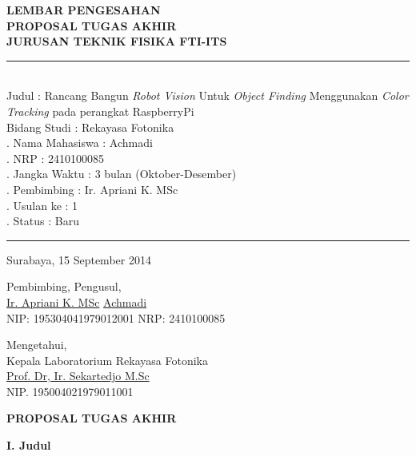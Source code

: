 \documentclass[a4paper,12pt]{article}
\begin{document}
\newpage
\begin{center}
  \textbf{ LEMBAR PENGESAHAN  }\\[5pt]
  \textbf{ PROPOSAL TUGAS AKHIR  } \\[5pt]
  \textbf{ JURUSAN TEKNIK FISIKA FTI-ITS  }\\[5pt]
\end{center}
\rule{385pt}{5pt}\\
\noindent Judul \hspace{80pt} : Rancang Bangun \textit{Robot Vision} Untuk \textit{Object Finding} Menggunakan \textit{Color Tracking} pada perangkat RaspberryPi\\[5pt]
\noindent Bidang Studi \hspace{42pt} : Rekayasa Fotonika\\[5pt]
. Nama Mahasiswa \hspace{5pt} : Achmadi\\[5pt]
. NRP  \hspace{70pt} : 2410100085\\[5pt]
. Jangka Waktu \hspace{20pt} : 3 bulan (Oktober-Desember)\\[5pt]
. Pembimbing \hspace{28pt} : Ir. Apriani K. MSc\\[5pt]
. Usulan ke \hspace{40pt} : 1\\[5pt]
. Status \hspace{60pt} : Baru\\[5pt]
\rule{385pt}{5pt}
\begin{flushright}
  Surabaya, 15 September 2014
\end{flushright}
\begin{flushleft}
Pembimbing, \hspace{230pt} Pengusul, 
\\[40pt]
\underline{Ir. Apriani K. MSc} \hspace{200pt} \underline{Achmadi}\\
NIP: 195304041979012001 \hspace{150pt} NRP: 2410100085
\\[40pt]
\end{flushleft}
\begin{center}
  Mengetahui,\\
  Kepala Laboratorium Rekayasa Fotonika
  \\[40pt]
  \underline{Prof. Dr, Ir. Sekartedjo M.Sc}\\
  NIP. 195004021979011001
\end{center}
\newpage
\begin{center}
 \textbf{PROPOSAL TUGAS AKHIR}
\end{center}
\noindent \textbf{I. \hspace{10pt} Judul}
\end{document}

